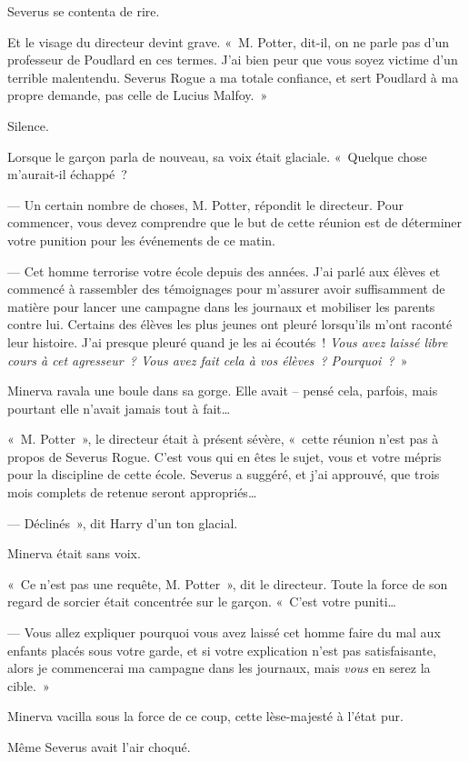 Severus se contenta de rire.

Et le visage du directeur devint grave.
«~M. Potter, dit-il, on ne parle pas d'un professeur de Poudlard en ces termes.
J'ai bien peur que vous soyez victime d'un terrible malentendu.
Severus Rogue a ma totale confiance, et sert Poudlard à ma propre demande, pas celle de Lucius Malfoy.~»

Silence.

Lorsque le garçon parla de nouveau, sa voix était glaciale.
«~Quelque chose m'aurait-il échappé~?

--- Un certain nombre de choses, M. Potter, répondit le directeur.
Pour commencer, vous devez comprendre que le but de cette réunion est de déterminer votre punition pour les événements de ce matin.

--- Cet homme terrorise votre école depuis des années.
J'ai parlé aux élèves et commencé à rassembler des témoignages pour m'assurer avoir suffisamment de matière pour lancer une campagne dans les journaux et mobiliser les parents contre lui.
Certains des élèves les plus jeunes ont pleuré lorsqu'ils m'ont raconté leur histoire.
J'ai presque pleuré quand je les ai écoutés~!
\emph{Vous avez laissé libre cours à cet agresseur~?
Vous avez fait cela à vos élèves~?
Pourquoi~?}~»

Minerva ravala une boule dans sa gorge.
Elle avait -- pensé cela, parfois, mais pourtant elle n'avait jamais tout à fait…

«~M. Potter~», le directeur était à présent sévère, «~cette réunion n'est pas à propos de Severus Rogue.
C'est vous qui en êtes le sujet, vous et votre mépris pour la discipline de cette école.
Severus a suggéré, et j'ai approuvé, que trois mois complets de retenue seront appropriés…

--- Déclinés~», dit Harry d'un ton glacial.

Minerva était sans voix.

«~Ce n'est pas une requête, M. Potter~», dit le directeur.
Toute la force de son regard de sorcier était concentrée sur le garçon.
«~C'est votre puniti…

--- Vous allez expliquer pourquoi vous avez laissé cet homme faire du mal aux enfants placés sous votre garde, et si votre explication n'est pas satisfaisante, alors je commencerai ma campagne dans les journaux, mais \emph{vous} en serez la cible.~»

Minerva vacilla sous la force de ce coup, cette lèse-majesté à l'état pur.

Même Severus avait l'air choqué.

